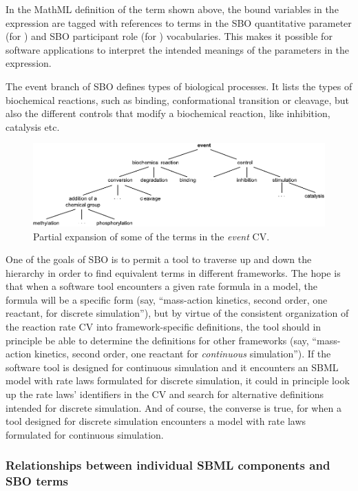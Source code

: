 In the MathML definition of the term shown above, the bound
variables in the  expression are tagged with
references to terms in the SBO quantitative parameter (for
) and SBO participant role (for ) vocabularies.
This makes it possible for software applications to interpret the
intended meanings of the parameters in the expression.

The event branch of SBO defines types of biological processes. It lists the types of biochemical reactions, such as binding, conformational transition or cleavage, but also the different controls that modify a biochemical reaction, like inhibition, catalysis etc.

\begin{figure}[tbh]
  \centering
  \includegraphics[scale = 0.97]{figs/sbo-event}
  \caption{Partial expansion of some of the terms in the \emph{event} CV.}
  \label{fig:sbo-event}
\end{figure}

One of the goals of SBO is to permit a tool to traverse up and
down the hierarchy in order to find equivalent terms in different
frameworks.  The hope is that when a software tool encounters a
given rate formula in a model, the formula will be a specific form
(say, ``mass-action kinetics, second order, one reactant, for
discrete simulation''), but by virtue of the consistent
organization of the reaction rate CV into framework-specific
definitions, the tool should in principle be able to determine the
definitions for other frameworks (say, ``mass-action kinetics,
second order, one reactant for \emph{continuous} simulation'').
If the software tool is designed for continuous simulation and it
encounters an SBML model with rate laws formulated for discrete
simulation, it could in principle look up the rate laws'
identifiers in the CV and search for alternative definitions
intended for discrete simulation.  And of course, the converse is
true, for when a tool designed for discrete simulation encounters
a model with rate laws formulated for continuous simulation.

\subsubsection{Relationships between individual SBML components and SBO terms}

